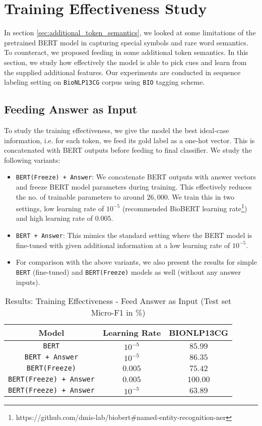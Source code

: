 \section{Training Effectiveness Study}
In section \ref{sec:additional_token_semantics}, we looked at some limitations of the pretrained BERT model in capturing special symbols and rare word semantics. To counteract, we proposed feeding in some additional token semantics. In this section, we study how effectively the model is able to pick cues and learn from the supplied additional features. Our experiments are conducted in sequence labeling setting on \texttt{BioNLP13CG} corpus using \texttt{BIO} tagging scheme.

\subsection{Feeding Answer as Input}
To study the training effectiveness, we give the model the best ideal-case information, i.e. for each token, we feed its gold label as a one-hot vector. This is concatenated with BERT outputs before feeding to final classifier. We study the following variants:

\begin{itemize}
    \item \texttt{BERT(Freeze) + Answer}: We concatenate BERT outputs with answer vectors and freeze BERT model parameters during training. This effectively reduces the no. of trainable parameters to around $26,000$. We train this in two settings, low learning rate of $10^{-5}$ (recommended BioBERT learning rate\footnote{https://github.com/dmis-lab/biobert\#named-entity-recognition-ner}) and high learning rate of $0.005$.
    
    \item \texttt{BERT + Answer}: This mimics the standard setting where the BERT model is fine-tuned with given additional information at a low learning rate of $10^{-5}$.
    
    \item For comparison with the above variants, we also present the results for simple \texttt{BERT} (fine-tuned) and \texttt{BERT(Freeze)} models as well (without any answer inputs).
\end{itemize}

\begin{table}[h!]
\centering
\begin{tabular}{|c|c|c|}\hline
	\textbf{Model} & \textbf{Learning Rate} & \textbf{BIONLP13CG}\\\hline
	\texttt{BERT} & $10^{-5}$ & $85.99$\\\hline
	\texttt{BERT + Answer} & $10^{-5}$ & $86.35$\\\hline
	\texttt{BERT(Freeze)} & $0.005$ & $75.42$\\\hline
	\texttt{BERT(Freeze) + Answer} & $0.005$ & $100.00$\\\hline
	\texttt{BERT(Freeze) + Answer} & $10^{-5}$ & $63.89$\\\hline
	\end{tabular}
    \caption{Results: Training Effectiveness - Feed Answer as Input (Test set Micro-F1 in \%)}
    \label{tab:res_training_ans_input}
\end{table}

